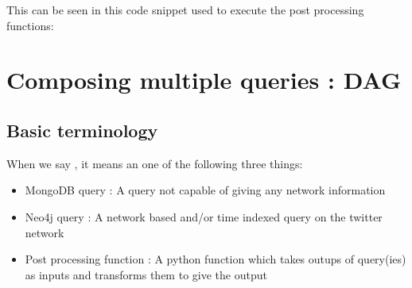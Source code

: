 \documentclass[letterpaper,10pt,english]{sphinxmanual}
\begin{document}
This can be seen in this code snippet used to execute the post processing functions:

\begin{sphinxVerbatim}[commandchars=\\\{\}]
  
         
       
        \PYG{p}{[}\PYG{p}{]}  \PYG{p}{[}\PYG{p}{]}
   
\end{sphinxVerbatim}


\chapter{Composing multiple queries : DAG}
\label{\detokenize{dag::doc}}\label{\detokenize{dag:composing-multiple-queries-dag}}

\section{Basic terminology}
\label{\detokenize{dag:basic-terminology}}
When we say , it means an one of the following three things:
\begin{itemize}
\item {} 
MongoDB query : A query not capable of giving any network information

\item {} 
Neo4j query : A network based and/or time indexed query on the twitter network

\item {} 
Post processing function : A python function which takes outups of query(ies) as inputs and transforms them to give the output

\end{itemize}
\end{document}

